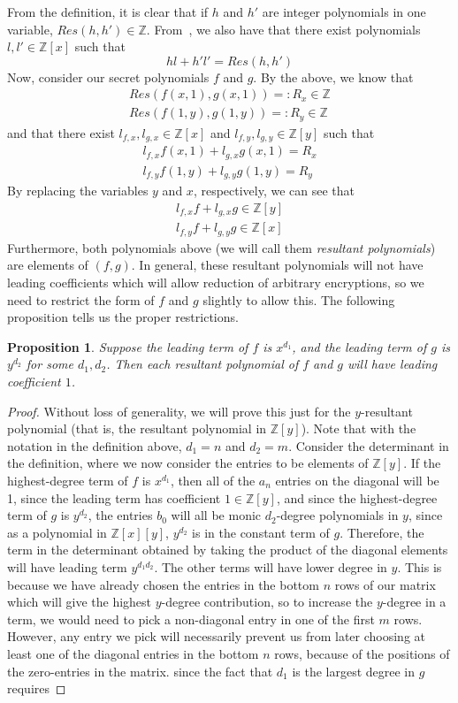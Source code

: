 \documentclass[11pt]{report}
\newtheorem{proposition}{Proposition}
\newcommand{\Z}{\mathbb{Z}}
\newcommand{\Zx}{\mathbb{Z}[x]}
\newcommand{\Zy}{\mathbb{Z}[y]}
\begin{document}
From the definition, it is clear that if $h$ and $h'$ are integer polynomials in one variable, $Res(h,h') \in \Z$. From~\cite{lang-algebra}, we also have that there exist polynomials $l,l'\in \Zx$ such that
\[hl+h'l' = Res(h,h') \]
Now, consider our secret polynomials $f$ and $g$. By the above, we know that
\begin{align*}
Res(f(x,1),g(x,1)) =: R_x \in \Z\\
Res(f(1,y),g(1,y)) =: R_y \in \Z
\end{align*}
and that there exist $l_{f,x}, l_{g,x}\in \Zx$ and $l_{f,y}, l_{g,y}\in \Zy$ such that
\begin{align*}
l_{f,x}f(x,1)+l_{g,x}g(x,1) = R_x\\
l_{f,y}f(1,y)+l_{g,y}g(1,y) = R_y
\end{align*}
By replacing the variables $y$ and $x$, respectively, we can see that
\begin{align*}
l_{f,x}f+l_{g,x}g \in \Zy\\
l_{f,y}f+l_{g,y}g \in \Zx
\end{align*}
Furthermore, both polynomials above (we will call them \emph{resultant polynomials}) are elements of $(f,g)$. In general, these resultant polynomials will not have leading coefficients which will allow reduction of arbitrary encryptions, so we need to restrict the form of $f$ and $g$ slightly to allow this. The following proposition tells us the proper restrictions.

\begin{proposition}
Suppose the leading term of $f$ is $x^{d_1}$, and the leading term of $g$ is $y^{d_2}$ for some $d_1, d_2$. Then each resultant polynomial of $f$ and $g$ will have leading coefficient $1$.
\end{proposition}
\begin{proof}
Without loss of generality, we will prove this just for the $y$-resultant polynomial (that is, the resultant polynomial in $\Zy$). Note that with the notation in the definition above, $d_1 = n$ and $d_2=m$. Consider the determinant in the definition, where we now consider the entries to be elements of $\Zy$. If the highest-degree term of $f$ is $x^{d_1}$, then all of the $a_n$ entries on the diagonal will be 1, since the leading term has coefficient $1\in \Zy$, and since the highest-degree term of $g$ is $y^{d_2}$, the entries $b_0$ will all be monic $d_2$-degree polynomials in $y$, since as a polynomial in $\Zx[y]$, $y^{d_2}$ is in the constant term of $g$. Therefore, the term in the determinant obtained by taking the product of the diagonal elements will have leading term $y^{d_1d_2}$. The other terms will have lower degree in $y$. This is because we have already chosen the entries in the bottom $n$ rows of our matrix which will give the highest $y$-degree contribution, so to increase the $y$-degree in a term, we would need to pick a non-diagonal entry in one of the first $m$ rows. However, any entry we pick will necessarily prevent us from later choosing at least one of the diagonal entries in the bottom $n$ rows, because of the positions of the zero-entries in the matrix.  since the fact that $d_1$ is the largest degree in $g$ requires 
\end{proof}
\end{document}
